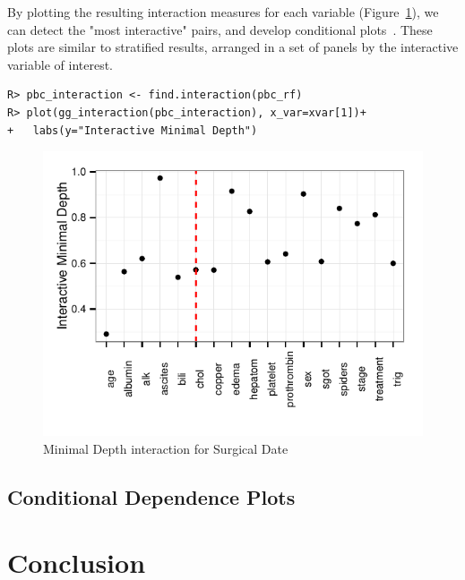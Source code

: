 \documentclass[nojss]{jss}\usepackage[]{graphicx}\usepackage[]{color}
\makeatletter
\def\maxwidth{ %
  \ifdim\Gin@nat@width>\linewidth
    \linewidth
  \else
    \Gin@nat@width
  \fi
}
\newenvironment{kframe}{%
 \def\at@end@of@kframe{}%
 \ifinner\ifhmode%
  \def\at@end@of@kframe{\end{minipage}}%
  \begin{minipage}{\columnwidth}%
 \fi\fi%
 \def\FrameCommand##1{\hskip\@totalleftmargin \hskip-\fboxsep
 \colorbox{shadecolor}{##1}\hskip-\fboxsep
     \hskip-\linewidth \hskip-\@totalleftmargin \hskip\columnwidth}%
 \MakeFramed {\advance\hsize-\width
   \@totalleftmargin\z@ \linewidth\hsize
   \@setminipage}}%
 {\par\unskip\endMakeFramed%
 \at@end@of@kframe}
\newenvironment{knitrout}{}{} %
\makeatother
\begin{document}
By plotting the resulting interaction measures for each variable (Figure~\ref{fig:interaction}), we can detect the "most interactive" pairs, and develop conditional plots~\cite{chambers:1992,cleveland:1993}. These plots are similar to stratified results, arranged in a set of panels by the interactive variable of interest. 
\begin{knitrout}\footnotesize
{}\color{fgcolor}\begin{kframe}
\begin{verbatim}
R> pbc_interaction <- find.interaction(pbc_rf)
R> plot(gg_interaction(pbc_interaction), x_var=xvar[1])+
+   labs(y="Interactive Minimal Depth")
\end{verbatim}
\end{kframe}
\end{knitrout}
\begin{knitrout}\footnotesize
{}\color{fgcolor}\begin{figure}[!htpb]

{\centering \includegraphics[width=\maxwidth]{figure/rfs-interaction-1} 

}

\caption[Minimal Depth interaction for Surgical Date]{Minimal Depth interaction for Surgical Date\label{fig:interaction}}
\end{figure}


\end{knitrout}

\subsection{Conditional Dependence Plots}



\section{Conclusion}



\end{document}
